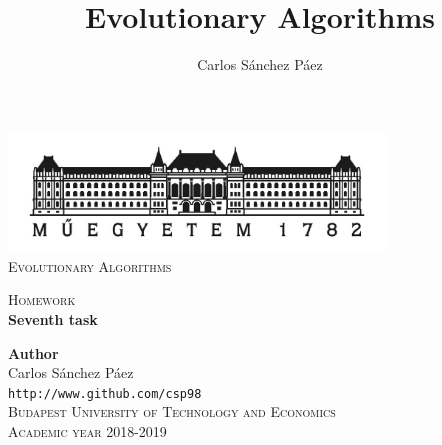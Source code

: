 \documentclass[12pt,english]{article}
\title{Evolutionary Algorithms}
\author{Carlos Sánchez Páez}
\begin{document}
\begin{titlepage}

\newlength{\centeroffset}
\setlength{\centeroffset}{-0.5\oddsidemargin}
\addtolength{\centeroffset}{0.5\evensidemargin}
\thispagestyle{empty}

\noindent\hspace*{\centeroffset}
\begin{minipage}{\textwidth}

\centering
\includegraphics[width=0.75\textwidth]{bme_logo.jpg}\\[1.4cm]

\textsc{ \Large Evolutionary Algorithms\\[4cm]}

\textsc{\Huge Homework}\\[0.75cm]

{\Large\bfseries Seventh task\\}
\end{minipage}

\vspace{8cm}
\noindent\hspace*{\centeroffset}
\begin{minipage}{\textwidth}
\centering

\textbf{Author}\\ {Carlos Sánchez Páez}\\
\texttt{http://www.github.com/csp98}\\[0.5cm]
\textsc{Budapest University of Technology and Economics}\\
\vspace{1cm}
\textsc{Academic year 2018-2019}
\end{minipage}
\end{titlepage}
\thispagestyle{empty}

\newpage
\end{document}

